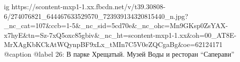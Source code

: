  
 
 
 
 

\ifcmt
  ig https://scontent-mxp1-1.xx.fbcdn.net/v/t39.30808-6/274076821_644467633529570_723939134320815440_n.jpg?_nc_cat=107&ccb=1-5&_nc_sid=5cd70e&_nc_ohc=Mn9GKsp0ZsYAX-x7hyE&tn=Sz-7xQ5oxc85gbiv&_nc_ht=scontent-mxp1-1.xx&oh=00_AT8E-MrXAgKbKCkAtWQynpBF9xLx_tMIn7C5V0eZQCgaBg&oe=62124171
  @caption @label 26: В парке Хрещатый. Музей Воды и ресторан \enquote{Саперави}
\fi
